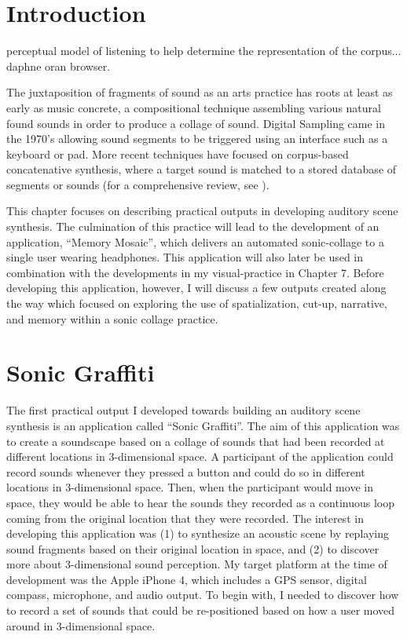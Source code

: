 \documentclass[a4paper,10pt,final]{ThesisStyle}
\begin{document}
\section{Introduction}

perceptual model of listening to help determine the representation of the corpus... daphne oran browser.


The juxtaposition of fragments of sound as an arts practice has roots at least as early as music concrete, a compositional technique assembling various natural found sounds in order to produce a collage of sound.  Digital Sampling came in the 1970's allowing sound segments to be triggered using an interface such as a keyboard or pad.  More recent techniques have focused on corpus-based concatenative synthesis, where a target sound is matched to a stored database of segments or sounds (for a comprehensive review, see \cite{Schwarz2006}).  

This chapter focuses on describing practical outputs in developing auditory scene synthesis.  The culmination of this practice will lead to the development of an application, ``Memory Mosaic'', which delivers an automated sonic-collage to a single user wearing headphones.  This application will also later be used in combination with the developments in my visual-practice in Chapter 7.   Before developing this application, however, I will discuss a few outputs created along the way which focused on exploring the use of spatialization, cut-up, narrative, and memory within a sonic collage practice.  

\section{Sonic Graffiti}

The first practical output I developed towards building an auditory scene synthesis is an application called ``Sonic Graffiti''.  The aim of this application was to create a soundscape based on a collage of sounds that had been recorded at different locations in 3-dimensional space.  A participant of the application could record sounds whenever they pressed a button and could do so in different locations in 3-dimensional space.  Then, when the participant would move in space, they would be able to hear the sounds they recorded as a continuous loop coming from the original location that they were recorded.  The interest in developing this application was (1) to synthesize an acoustic scene by replaying sound fragments based on their original location in space, and (2) to discover more about 3-dimensional sound perception.  My target platform at the time of development was the Apple iPhone 4, which includes a GPS sensor, digital compass, microphone, and audio output.  To begin with, I needed to discover how to record a set of sounds that could be re-positioned based on how a user moved around in 3-dimensional space.
\end{document}
